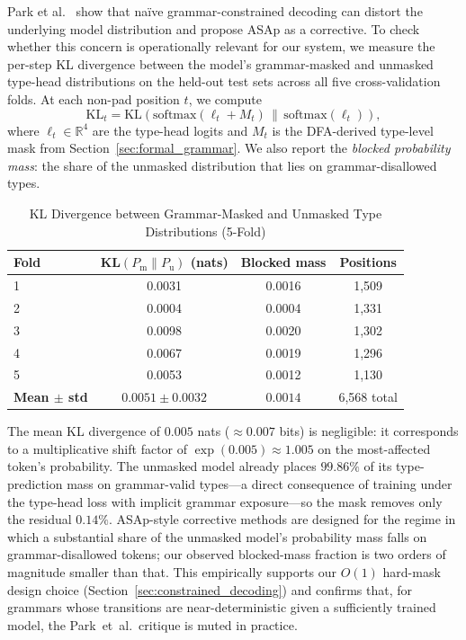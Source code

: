 \documentclass[11pt]{article}
\begin{document}
Park et al.~\cite{grammar_aligned} show that na\"ive grammar-constrained decoding can distort the underlying model distribution and propose ASAp as a corrective. To check whether this concern is operationally relevant for our system, we measure the per-step KL divergence between the model's grammar-masked and unmasked type-head distributions on the held-out test sets across all five cross-validation folds. At each non-pad position $t$, we compute
\[
\text{KL}_t = \mathrm{KL}\!\left(\mathrm{softmax}(\ell_t + M_t)\,\|\,\mathrm{softmax}(\ell_t)\right),
\]
where $\ell_t \in \mathbb{R}^4$ are the type-head logits and $M_t$ is the DFA-derived type-level mask from Section~\ref{sec:formal_grammar}. We also report the \emph{blocked probability mass}: the share of the unmasked distribution that lies on grammar-disallowed types.

\begin{table}[htbp]
\centering
\caption{KL Divergence between Grammar-Masked and Unmasked Type Distributions (5-Fold)}
\label{tab:kl_distortion}
\scriptsize
\begin{tabular}{@{}lccc@{}}
\toprule
\textbf{Fold} & \textbf{KL$(P_{\mathrm{m}}\!\|\!P_{\mathrm{u}})$} (nats) & \textbf{Blocked mass} & \textbf{Positions} \\
\midrule
1 & 0.0031 & 0.0016 & 1{,}509 \\
2 & 0.0004 & 0.0004 & 1{,}331 \\
3 & 0.0098 & 0.0020 & 1{,}302 \\
4 & 0.0067 & 0.0019 & 1{,}296 \\
5 & 0.0053 & 0.0012 & 1{,}130 \\
\midrule
\textbf{Mean $\pm$ std} & $\boldsymbol{0.0051 \pm 0.0032}$ & $\boldsymbol{0.0014}$ & 6{,}568 total \\
\bottomrule
\end{tabular}
\normalsize
\end{table}

The mean KL divergence of $0.005$ nats ($\approx 0.007$ bits) is negligible: it corresponds to a multiplicative shift factor of $\exp(0.005) \approx 1.005$ on the most-affected token's probability. The unmasked model already places $99.86\%$ of its type-prediction mass on grammar-valid types---a direct consequence of training under the type-head loss with implicit grammar exposure---so the mask removes only the residual $0.14\%$. ASAp-style corrective methods are designed for the regime in which a substantial share of the unmasked model's probability mass falls on grammar-disallowed tokens; our observed blocked-mass fraction is two orders of magnitude smaller than that. This empirically supports our $O(1)$ hard-mask design choice (Section~\ref{sec:constrained_decoding}) and confirms that, for grammars whose transitions are near-deterministic given a sufficiently trained model, the Park~et~al.\ critique is muted in practice.
\end{document}

